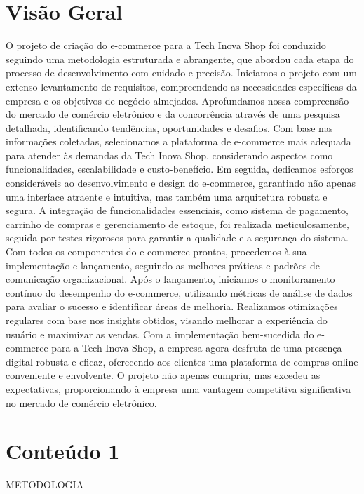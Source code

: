 	\section{Visão Geral}
		O projeto de criação do e-commerce para a Tech Inova Shop foi conduzido seguindo uma metodologia estruturada e abrangente, que abordou cada etapa do processo de desenvolvimento com cuidado e precisão. Iniciamos o projeto com um extenso levantamento de requisitos, compreendendo as necessidades específicas da empresa e os objetivos de negócio almejados. Aprofundamos nossa compreensão do mercado de comércio eletrônico e da concorrência através de uma pesquisa detalhada, identificando tendências, oportunidades e desafios.
Com base nas informações coletadas, selecionamos a plataforma de e-commerce mais adequada para atender às demandas da Tech Inova Shop, considerando aspectos como funcionalidades, escalabilidade e custo-benefício. Em seguida, dedicamos esforços consideráveis ao desenvolvimento e design do e-commerce, garantindo não apenas uma interface atraente e intuitiva, mas também uma arquitetura robusta e segura.
A integração de funcionalidades essenciais, como sistema de pagamento, carrinho de compras e gerenciamento de estoque, foi realizada meticulosamente, seguida por testes rigorosos para garantir a qualidade e a segurança do sistema. Com todos os componentes do e-commerce prontos, procedemos à sua implementação e lançamento, seguindo as melhores práticas e padrões de comunicação organizacional.
Após o lançamento, iniciamos o monitoramento contínuo do desempenho do e-commerce, utilizando métricas de análise de dados para avaliar o sucesso e identificar áreas de melhoria. Realizamos otimizações regulares com base nos insights obtidos, visando melhorar a experiência do usuário e maximizar as vendas.
Com a implementação bem-sucedida do e-commerce para a Tech Inova Shop, a empresa agora desfruta de uma presença digital robusta e eficaz, oferecendo aos clientes uma plataforma de compras online conveniente e envolvente. O projeto não apenas cumpriu, mas excedeu as expectativas, proporcionando à empresa uma vantagem competitiva significativa no mercado de comércio eletrônico.

	\section{Conteúdo 1}
	\label{sec:identificao}
        METODOLOGIA

